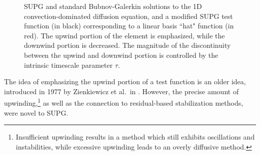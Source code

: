 \begin{figure}[!h]
\centering
{}
\caption{SUPG and standard Bubnov-Galerkin solutions to the 1D convection-dominated diffusion equation, and a modified SUPG test function (in black) corresponding to a linear basis ``hat" function (in red).  The upwind portion of the element is emphasized, while the downwind portion is decreased.  The magnitude of the discontinuity between the upwind and downwind portion is controlled by the intrinsic timescale parameter $\tau$. }
\label{fig:SUPG}
\end{figure}

The idea of emphasizing the upwind portion of a test function is an older idea, introduced in 1977 by Zienkiewicz et al.\ in \cite{zienkUpwind}.  However, the precise amount of upwinding,\footnote{Insufficient upwinding results in a method which still exhibits oscillations and instabilities, while excessive upwinding leads to an overly diffusive method.} as well as the connection to residual-based stabilization methods, were novel to SUPG.  

